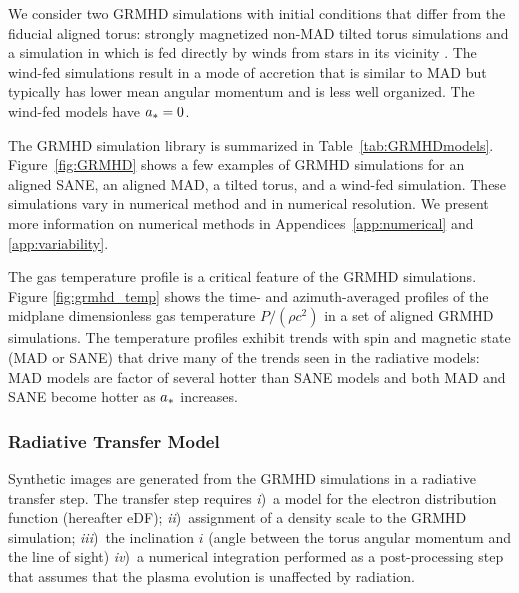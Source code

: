 We consider two GRMHD simulations with initial conditions that differ from the fiducial aligned torus: strongly magnetized non-MAD tilted torus simulations \citep{Liska2018, Chatterjee2020} and a simulation in which \sgra is fed directly by winds from stars in its vicinity \citep{2020ApJ...896L...6R}.
The wind-fed simulations result in a mode of accretion that is similar to MAD but typically has lower mean angular momentum and is less well organized.
The wind-fed models have $a_* = 0$.

The GRMHD simulation library is summarized in Table~\ref{tab:GRMHDmodels}.
Figure~\ref{fig:GRMHD} shows a few examples of GRMHD simulations for an aligned SANE, an aligned MAD, a tilted torus, and a wind-fed simulation.
These simulations vary in numerical method and in numerical resolution.
We present more information on numerical methods in Appendices~\ref{app:numerical} and \ref{app:variability}.

The gas temperature profile is a critical feature of the GRMHD simulations.
Figure \ref{fig:grmhd_temp} shows the time- and azimuth-averaged profiles of the midplane dimensionless gas temperature $P/(\rho c^2)$ in a set of aligned GRMHD simulations.
The temperature profiles exhibit trends with spin and magnetic state (MAD or SANE) that drive many of the trends seen in the radiative models: MAD models are factor of several hotter than SANE models and both MAD and SANE become hotter as $a_*$ increases.

\subsubsection{Radiative Transfer Model}

Synthetic images are generated from the GRMHD simulations in a radiative transfer step.  The transfer step requires
\emph{i})~a model for the electron distribution function (hereafter eDF);
\emph{ii})~assignment of a density scale to the GRMHD simulation;
\emph{iii})~the inclination $i$ (angle between the torus angular momentum and the line of sight)
\emph{iv})~a numerical integration performed as a post-processing step that assumes that the plasma evolution is unaffected by radiation.



